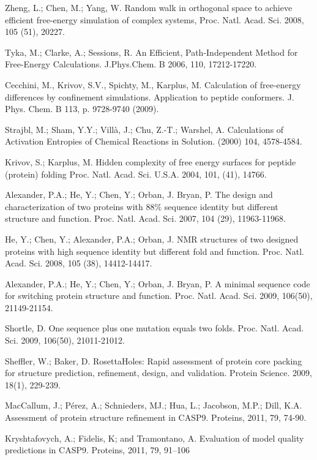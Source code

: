 \documentclass[12pt]{article}
\begin{document}
\begin{thebibliography}{99}
Zheng, L.; Chen, M.; Yang, W. Random walk in orthogonal space to achieve efficient free-energy simulation of complex systems, Proc. Natl. Acad. Sci. 2008, 105 (51), 20227.

Tyka, M.; Clarke, A.; Sessions, R. An Efficient, Path-Independent Method for Free-Energy Calculations. J.Phys.Chem. B 2006, 110, 17212-17220.

Cecchini, M., Krivov, S.V., Spichty, M., Karplus, M. Calculation of free-energy differences by confinement simulations. Application to peptide conformers. 
J. Phys. Chem. B 113, p. 9728-9740 (2009).

Strajbl, M.; Sham, Y.Y.; Villà, J.; Chu, Z.-T.; Warshel, A. Calculations of Activation Entropies of Chemical Reactions 
in Solution. (2000) 104, 4578-4584.  

Krivov, S.; Karplus, M. Hidden complexity of free energy surfaces for peptide (protein) folding Proc. Natl. Acad. Sci. U.S.A. 2004, 101, (41), 14766.

Alexander, P.A.; He, Y.; Chen, Y.; Orban, J. Bryan, P. The design and characterization of two proteins with $88 \%$ sequence identity but different 
structure and function. Proc. Natl. Acad. Sci. 2007, 104 (29), 11963-11968.

He, Y.; Chen, Y.; Alexander, P.A.; Orban, J. NMR structures of two designed proteins with high sequence identity but different fold and function. Proc. Natl. Acad. Sci. 2008, 105 (38), 14412-14417.

Alexander, P.A.; He, Y.; Chen, Y.; Orban, J. Bryan, P. A minimal sequence code for switching protein structure and function. Proc. Natl. Acad. Sci. 2009, 106(50), 21149-21154.

Shortle, D. One sequence plus one mutation equals two folds. Proc. Natl. Acad. Sci. 2009, 106(50), 21011-21012. 

Sheffler, W.; Baker, D. RosettaHoles: Rapid assessment of protein core packing for structure prediction, refinement, design, and validation. Protein Science. 2009, 18(1), 229-239.


MacCallum, J.; Pérez, A.; Schnieders, MJ.; Hua, L.; Jacobson, M.P.; Dill, K.A. Assessment of protein structure refinement 
in CASP9. Proteins, 2011, 79, 74-90.

Kryshtafovych, A.; Fidelis, K; and Tramontano, A. Evaluation of model quality predictions in CASP9. Proteins, 2011, 79, 91–106


\end{thebibliography}
\end{document}
